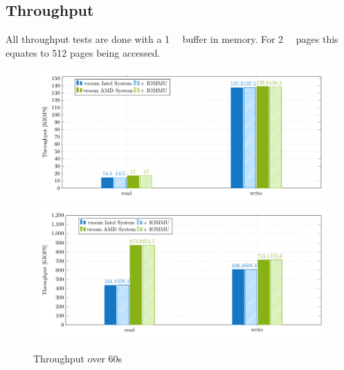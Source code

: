 \subsection{Throughput}
All throughput tests are done with a \qty{1}{\gibi\byte} buffer in memory. For \qty{2}{\mebi\byte} pages this equates to 512 pages being accessed.



\begin{figure}[H]
  \centering
   {\includegraphics[width=.9\textwidth]{figures/throughput_bar_qd1t1} \label{fig:throughput-qd1t1}}
   {\includegraphics[width=.9\textwidth]{figures/throughput_bar_qd32t4} \label{fig:throughput-qd32t4}}
  \caption{Throughput over 60s}
  \label{fig:throughput-bar}
\end{figure}


